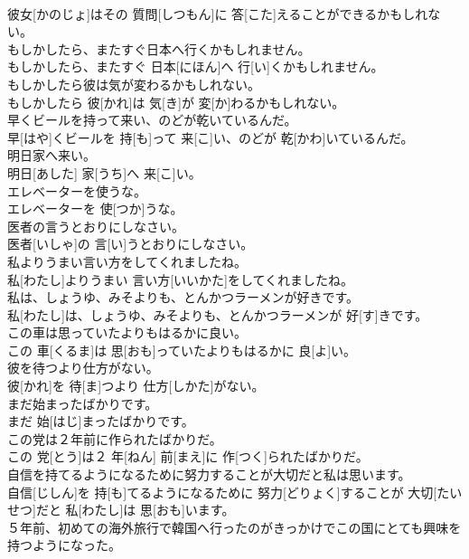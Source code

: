 \documentclass[8pt]{extreport}
\begin{document}
\begin{CJK}{UTF8}{min}
\\	彼女[かのじょ]はその 質問[しつもん]に 答[こた]えることができるかもしれない。	
\\	もしかしたら、またすぐ日本へ行くかもしれません。	
\\	もしかしたら、またすぐ 日本[にほん]へ 行[い]くかもしれません。	
\\	もしかしたら彼は気が変わるかもしれない。	
\\	もしかしたら 彼[かれ]は 気[き]が 変[か]わるかもしれない。	
\\	早くビールを持って来い、のどが乾いているんだ。	
\\	早[はや]くビールを 持[も]って 来[こ]い、のどが 乾[かわ]いているんだ。	
\\	明日家へ来い。	
\\	明日[あした] 家[うち]へ 来[こ]い。	
\\	エレベーターを使うな。	
\\	エレベーターを 使[つか]うな。	
\\	医者の言うとおりにしなさい。	
\\	医者[いしゃ]の 言[い]うとおりにしなさい。	
\\	私よりうまい言い方をしてくれましたね。	
\\	私[わたし]よりうまい 言い方[いいかた]をしてくれましたね。	
\\	私は、しょうゆ、みそよりも、とんかつラーメンが好きです。	
\\	私[わたし]は、しょうゆ、みそよりも、とんかつラーメンが 好[す]きです。	
\\	この車は思っていたよりもはるかに良い。	
\\	この 車[くるま]は 思[おも]っていたよりもはるかに 良[よ]い。	
\\	彼を待つより仕方がない。	
\\	彼[かれ]を 待[ま]つより 仕方[しかた]がない。	
\\	まだ始まったばかりです。	
\\	まだ 始[はじ]まったばかりです。	
\\	この党は２年前に作られたばかりだ。	
\\	この 党[とう]は２ 年[ねん] 前[まえ]に 作[つく]られたばかりだ。	
\\	自信を持てるようになるために努力することが大切だと私は思います。	
\\	自信[じしん]を 持[も]てるようになるために 努力[どりょく]することが 大切[たいせつ]だと 私[わたし]は 思[おも]います。	
\\	５年前、初めての海外旅行で韓国へ行ったのがきっかけでこの国にとても興味を持つようになった。	

\end{CJK}
\end{document}
